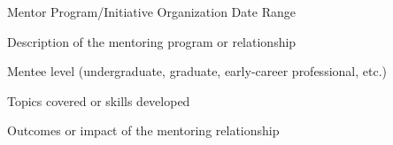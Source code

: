 \begin{cventries}
    \cventry
    {Mentor} %
    {Program/Initiative} %
    {Organization} %
    {Date Range} %
    {
      \begin{cvitems} %
        \item {Description of the mentoring program or relationship}
        \item {Mentee level (undergraduate, graduate, early-career professional, etc.)}
        \item {Topics covered or skills developed}
        \item {Outcomes or impact of the mentoring relationship}
      \end{cvitems}
    }
\end{cventries}
